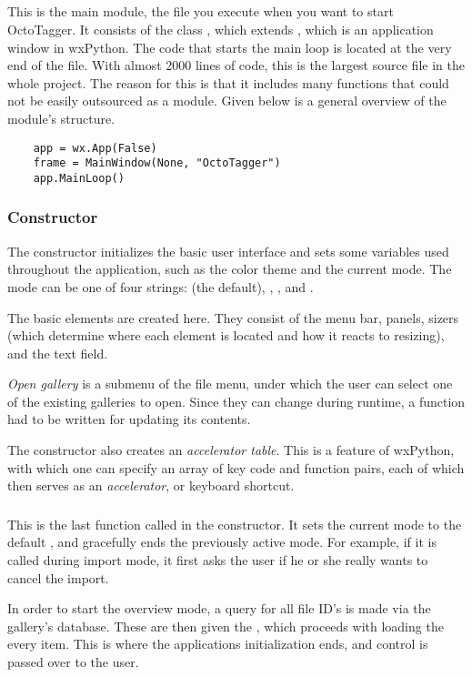 \subsection{}
\def\kapitelautor{Erik Ritschl}

This is the main module, the file you execute when you want to start
OctoTagger. It consists of the class , which extends
, which is an application window in wxPython.
The code that starts the main loop is located at the very end of the file. %
With almost 2000 lines of code, this is the largest source file in the whole
project. The reason for this is that it includes many functions that could not
be easily outsourced as a module. Given below is a general overview of the
module's structure.

\begin{verbatim}
	app = wx.App(False)
	frame = MainWindow(None, "OctoTagger")
	app.MainLoop()
\end{verbatim}

\subsubsection{Constructor}

The constructor initializes the basic user interface and sets some variables
used throughout the application, such as the color theme and the current mode.
The mode can be one of four strings:  (the default),
, , and .

The basic elements are created here. They consist of the menu bar, panels,
sizers (which determine where each element is located and how it reacts to
resizing), and the text field. %

\emph{Open gallery} is a submenu of the file menu, under which the user can
select one of the existing galleries to open. Since they can change during
runtime, a function had to be written for updating its contents.

The constructor also creates an \emph{accelerator table}. This is a feature
of wxPython, with which one can specify an array of key code
and function pairs, each of which then serves as an \emph{accelerator}, or
keyboard shortcut.

\subsubsection{}

This is the last function called in the constructor. It sets the current mode
to the default , and gracefully ends the previously active
mode. For example, if it is called during import mode, it first asks the user
if he or she really wants to cancel the import.

In order to start the overview mode, a query for all file ID's is made via the
gallery's database. These are then given the , which proceeds
with loading the every item. This is where the applications initialization
ends, and control is passed over to the user.
